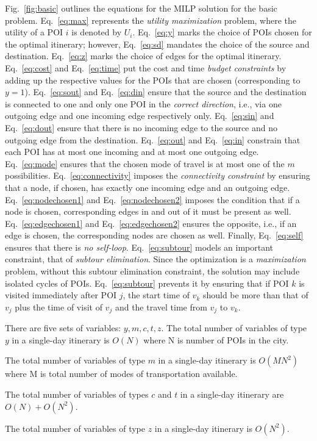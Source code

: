 Fig.~\ref{fig:basic} outlines the equations for the
MILP solution for the basic \trip problem.  Eq.~\eqref{eq:max}
represents the \emph{utility maximization} problem, where the
utility of a POI $i$ is denoted by $U_i$.  Eq.~\eqref{eq:y} marks
the choice of POIs chosen for the optimal itinerary; however,
Eq.~\eqref{eq:sd} mandates the choice of the source and destination.
Eq.~\eqref{eq:z} marks the choice of edges for the optimal
itinerary.  Eq.~\eqref{eq:cost} and Eq.~\eqref{eq:time} put the
cost and time \emph{budget constraints} by adding up the
respective values for the POIs that are chosen (corresponding to
$y = 1$).  Eq.~\eqref{eq:sout} and Eq.~\eqref{eq:din} ensure that
the source and the destination is connected to one and only one
POI in the \emph{correct direction}, i.e., via one outgoing edge
and one incoming edge respectively only.  Eq.~\eqref{eq:sin} and
Eq.~\eqref{eq:dout} ensure that there is no incoming edge to the
source and no outgoing edge from the destination.
Eq.~\eqref{eq:out} and Eq.~\eqref{eq:in} constrain that each POI
has at most one incoming and at most one outgoing edge.
Eq.~\eqref{eq:mode} ensures that the chosen mode of travel is at
most one of the $m$ possibilities.  Eq.~\eqref{eq:connectivity}
imposes the \emph{connectivity constraint} by ensuring that a
node, if chosen, has exactly one incoming edge and an outgoing
edge.  Eq.~\eqref{eq:nodechosen1} and Eq.~\eqref{eq:nodechosen2}
imposes the condition that if a node is chosen, corresponding
edges in and out of it must be present as well.
Eq.~\eqref{eq:edgechosen1} and Eq.~\eqref{eq:edgechosen2} ensures
the opposite, i.e., if an edge is chosen, the corresponding nodes
are chosen as well.  Finally, Eq.~\eqref{eq:self} ensures that
there is \emph{no self-loop}.
Eq.~\eqref{eq:subtour} models an important constraint, that of \emph{subtour
elimination}.
Since the optimization is a \emph{maximization} problem, without this subtour
elimination constraint, the solution may include isolated cycles of POIs.
Eq.~\eqref{eq:subtour} prevents it by ensuring that if POI $k$ is visited
immediately after POI $j$, the start time of $v_k$ should be more than that of
$v_j$ plus the time of visit of $v_j$ and the travel time from $v_j$ to $v_k$.

There are five sets of variables: $y, m, c, t, z$.  
The total number of variables of type $y$ in a single-day itinerary is $O(N)$ where N is number of POIs in the city.
The total number of variables of type $m$ in a single-day itinerary is $O(MN^2)$ where M is total number of modes of transportation available.
The total number of variables of types $c$ and $t$ in a single-day itinerary are $O(N) + O(N^2)$.
The total number of variables of type $z$ in a single-day itinerary is $O(N^2)$.

